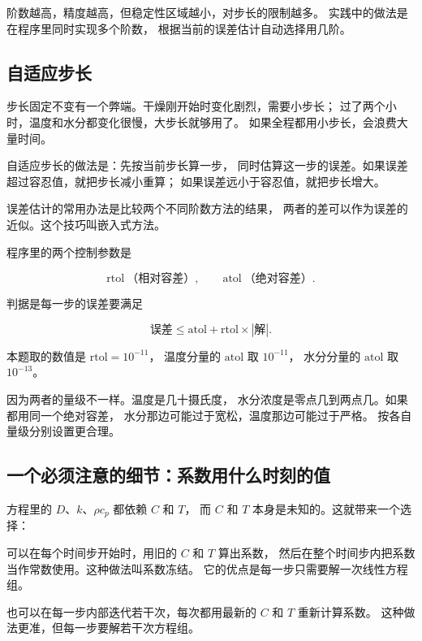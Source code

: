 阶数越高，精度越高，但稳定性区域越小，对步长的限制越多。
实践中的做法是在程序里同时实现多个阶数，
根据当前的误差估计自动选择用几阶。

\subsection{自适应步长}

步长固定不变有一个弊端。干燥刚开始时变化剧烈，需要小步长；
过了两个小时，温度和水分都变化很慢，大步长就够用了。
如果全程都用小步长，会浪费大量时间。

自适应步长的做法是：先按当前步长算一步，
同时估算这一步的误差。如果误差超过容忍值，就把步长减小重算；
如果误差远小于容忍值，就把步长增大。

误差估计的常用办法是比较两个不同阶数方法的结果，
两者的差可以作为误差的近似。这个技巧叫嵌入式方法。

程序里的两个控制参数是

\begin{equation}
\mathrm{rtol}\ \text{（相对容差）}, \qquad \mathrm{atol}\ \text{（绝对容差）}.
\end{equation}

判据是每一步的误差要满足

\begin{equation}
\text{误差} \le \mathrm{atol} + \mathrm{rtol}\times\left|\text{解}\right|.
\end{equation}

本题取的数值是 $\mathrm{rtol}=10^{-11}$，
温度分量的 $\mathrm{atol}$ 取 $10^{-11}$，
水分分量的 $\mathrm{atol}$ 取 $10^{-13}$。

因为两者的量级不一样。温度是几十摄氏度，
水分浓度是零点几到两点几。如果都用同一个绝对容差，
水分那边可能过于宽松，温度那边可能过于严格。
按各自量级分别设置更合理。

\subsection{一个必须注意的细节：系数用什么时刻的值}

方程里的 $D$、$k$、$\rho c_p$ 都依赖 $C$ 和 $T$，
而 $C$ 和 $T$ 本身是未知的。这就带来一个选择：

可以在每个时间步开始时，用旧的 $C$ 和 $T$ 算出系数，
然后在整个时间步内把系数当作常数使用。这种做法叫系数冻结。
它的优点是每一步只需要解一次线性方程组。

也可以在每一步内部迭代若干次，每次都用最新的 $C$ 和 $T$ 重新计算系数。
这种做法更准，但每一步要解若干次方程组。


